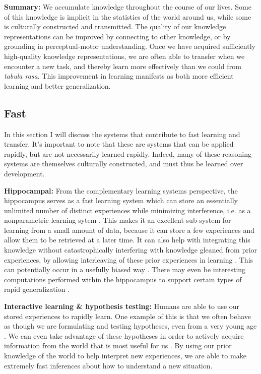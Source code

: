 \textbf{Summary:} We accumulate knowledge throughout the course of our lives. Some of this knowledge is implicit in the statistics of the world around us, while some is culturally constructed and transmitted. The quality of our knowledge representations can be improved by connecting to other knowledge, or by grounding in perceptual-motor understanding. Once we have acquired sufficiently high-quality knowledge representations, we are often able to transfer when we encounter a new task, and thereby learn more effectively than we could from \textit{tabula rasa}. This improvement in learning manifests as both more efficient learning and better generalization. \par

\subsection{Fast}
In this section I will discuss the systems that contribute to fast learning and transfer. It's important to note that these are systems that can be applied rapidly, but are not necessarily learned rapidly. Indeed, many of these reasoning systems are themselves culturally constructed, and must thus be learned over development. \par
\textbf{Hippocampal:} From the complementary learning systems perspective, the hippocampus serves as a fast learning system which can store an essentially unlimited number of distinct experiences while minimizing interference, i.e. as a nonparametric learning sytem \citep{Kumaran2016}. This makes it an excellent sub-system for learning from a small amount of data, because it can store a few experiences and allow them to be retrieved at a later time. It can also help with integrating this knowledge without catastrophically interfering \citep{McCloskey1989} with knowledge gleaned from prior experiences, by allowing interleaving of these prior experiences in learning \citep{McClelland1995}. This can potentially occur in a usefully biased way \citep{Kumaran2016}. There may even be interesting computations performed within the hippocampus to support certain types of rapid generalization \citep{Kumaran2012}. \par 
\textbf{Interactive learning \& hypothesis testing:} Humans are able to use our stored experiences to rapidly learn. One example of this is that we often behave as though we are formulating and testing hypotheses, even from a very young age \citep{Sobel2004, Gopnik2014}. We can even take advantage of these hypotheses in order to actively acquire information from the world that is most useful for us \citep[e.g.][]{Markant2014a}. By using our prior knowledge of the world to help interpret new experiences, we are able to make extremely fast inferences about how to understand a new situation. \par

